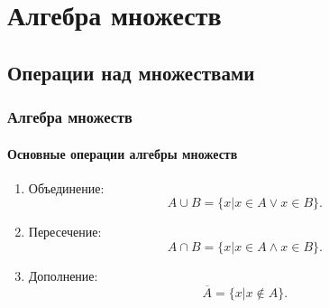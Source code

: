 \section{Алгебра множеств}


\subsection{Операции над множествами}

\begin{frame}
    \frametitle{Алгебра множеств}
    \framesubtitle{Основные операции алгебры множеств}
    
    \begin{enumerate}
        \item Объединение:\[A\cup B=\{x|x\in A \lor x\in B\}.\]
        
        \item Пересечение:\[A\cap B=\{x|x\in A \land x\in B\}.\]
        
        \item Дополнение:\[\overline{A}=\{x|x\not\in A\}.\]
    \end{enumerate}
\end{frame}

